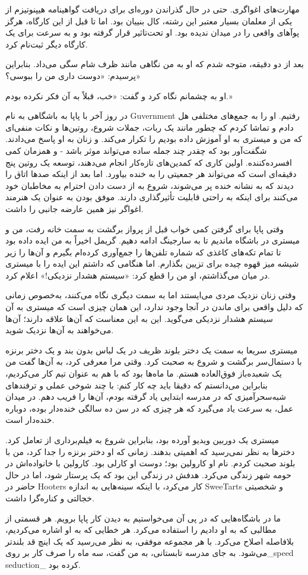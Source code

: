 مهارت‌های اغواگری. حتی در حال گذراندن دوره‌ای برای دریافت گواهینامه هیپنوتیزم از یکی از معلمان بسیار معتبر این رشته، کال بنییان بود. اما تا قبل از این کارگاه، هرگز پوآهای واقعی را در میدان ندیده بود. او تحت‌تاثیر قرار گرفته بود و به سرعت برای یک کارگاه دیگر ثبت‌نام کرد. 

بعد از دو دقیقه، متوجه شدم که او به من نگاهی مانند ظرف شام سگی می‌داد. بنابراین پرسیدم: «دوست داری من را ببوسی؟‌»

او به چشمانم نگاه کرد و گفت: «خب، قبلاً به آن فکر نکرده بودم.» 

در روز آخر با پاپا به باشگاهی به نام Guvernment رفتیم. او را به جمع‌های مختلفی هل دادم و تماشا کردم که چطور مانند یک ربات، جملات شروع، روتین‌ها و نکات منفی‌ای که من و میستری به او آموزش داده بودیم را تکرار می‌کند. و زنان به او پاسخ می‌دادند. شگفت‌آور بود که چقدر چند جمله ساده می‌تواند موثر باشد - و همزمان کمی افسرده‌کننده. اولین کاری که کمدین‌های تازه‌کار انجام می‌دهند، توسعه یک روتین پنج دقیقه‌ای است که می‌تواند هر جمعیتی را به خنده بیاورد. اما بعد از اینکه صدها اتاق را دیدند که به نشانه خنده پر می‌شوند، شروع به از دست دادن احترام به مخاطبان خود می‌کنند برای اینکه به راحتی قابلیت تأثیرگذاری دارند. موفق بودن به عنوان یک هنرمند اغواگر نیز همین عارضه جانبی را داشت.

وقتی پاپا برای گرفتن کمی خواب قبل از پرواز برگشت به سمت خانه رفت، من و میستری در باشگاه ماندیم تا به سارجینگ ادامه دهیم. گریمل اخیراً به من ایده داده بود تا تمام تکه‌های کاغذی که شماره تلفن‌ها را جمع‌آوری کرده‌ام بگیرم و آن‌ها را زیر شیشه میز قهوه چیده برای تزیین بگذارم. اما هنگامی که داشتم این ایده را با میستری در میان می‌گذاشتم، او من را قطع کرد: «سیستم هشدار نزدیکی!» اعلام کرد.

وقتی زنان نزدیک مردی می‌ایستند اما به سمت دیگری نگاه می‌کنند، به‌خصوص زمانی که دلیل واقعی برای ماندن در آنجا وجود ندارد، این همان چیزی است که میستری به آن سیستم هشدار نزدیکی می‌گوید. این به این معناست که آن‌ها علاقه دارند؛ آن‌ها می‌خواهند به آن‌ها نزدیک شوید. 

میستری سریعا به سمت یک دختر بلوند ظریف در یک لباس بدون بند و یک دختر برنزه با دستمال‌سر برگشت و شروع به صحبت کرد. وقتی مرا معرفی کرد، به آن‌ها گفت من یک شعبده‌باز فوق‌العاده هستم. ما ماه‌ها بود که با هم به عنوان تیم کار می‌کردیم، بنابراین می‌دانستم که دقیقا باید چه کار کنم: با چند شوخی عملی و ترفندهای شبه‌سحرآمیزی که در مدرسه ابتدایی یاد گرفته بودم، آن‌ها را فریب دهم. در میدان عمل، به سرعت یاد می‌گیرد که هر چیزی که در سن ده سالگی خنده‌دار بوده، دوباره خنده‌دار است.

میستری یک دوربین ویدیو آورده بود، بنابراین شروع به فیلم‌برداری از تعامل کرد. دخترها به نظر نمی‌رسید که اهمیتی بدهند. زمانی که او دختر برنزه را جدا کرد، من با بلوند صحبت کردم. نام او کارولین بود؛ دوست او کارلی بود. کارولین با خانواده‌اش در حومه شهر زندگی می‌کرد. هدفش در زندگی این بود که یک پرستار شود، اما در حال حاضر در Hooters کار می‌کرد، با اینکه سینه‌هایی به اندازه SweeTarts و شخصیتی خجالتی و کناره‌گرا داشت.

ما در باشگاه‌هایی که در پی آن می‌خواستیم به دیدن کار پاپا برویم. هر قسمتی از مطالبی که به او دادیم را استفاده می‌کرد. هر خطایی که به او اشاره می‌کردیم، بلافاصله اصلاح می‌کرد. با هر مجموعه موفقی، به نظر می‌رسید که یک اینچ قد بلندتر می‌شود. به جای مدرسه تابستانی، به من گفت، سه ماه را صرف کار بر روی_speed seduction_ کرده بود.